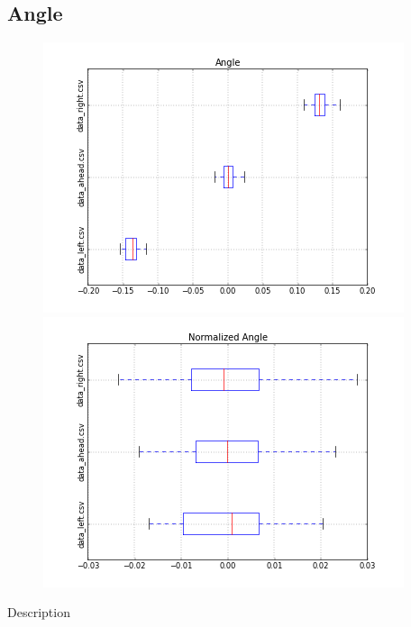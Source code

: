 \documentclass{scrartcl}
\begin{document}
\subsection{Angle}
\begin{figure}[H]
\centering
\begin{minipage}{.5\textwidth}
  \centering
  \includegraphics[width=1.0\linewidth]{img/BoxplotAngle.png}
\end{minipage}%
\begin{minipage}{.5\textwidth}
  \centering
  \includegraphics[width=1.0\linewidth]{img/BoxplotAngleNorm.png}
\end{minipage}
\end{figure}
Description
\end{document}
